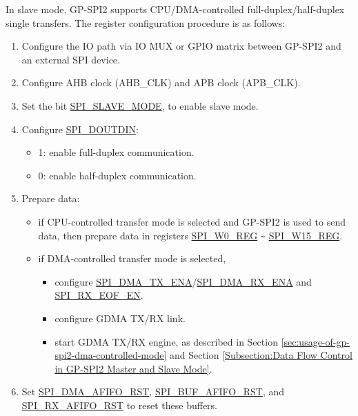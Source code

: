 \documentclass[main\_\_EN.tex]{subfiles}
\begin{document}
In slave mode, GP-SPI2 supports CPU/DMA-controlled full-duplex/half-duplex single transfers. The register configuration procedure is as follows:
\begin{enumerate}
    \item Configure the IO path via IO MUX or GPIO matrix between GP-SPI2 and an external SPI device.

    \item Configure AHB clock (AHB\_CLK) and APB clock (APB\_CLK).

    \item Set the bit \hyperref[fielddesc:SPISLAVEMODE]{SPI\_SLAVE\_MODE}, to enable slave mode.

    \item Configure \hyperref[fielddesc:SPIDOUTDIN]{SPI\_DOUTDIN}:
    \begin{itemize}
        \item 1: enable full-duplex communication.
        \item 0: enable half-duplex communication.
    \end{itemize}

    \item Prepare data:
    \begin{itemize}
        \item if CPU-controlled transfer mode is selected and GP-SPI2 is used to send data, then prepare data in registers \hyperref[regdesc:SPIW0REG]{SPI\_W0\_REG} \verb+~+ \hyperref[regdesc:SPIW15REG]{SPI\_W15\_REG}.
        \item if DMA-controlled transfer mode is selected,
        \begin{itemize}
            \item configure \hyperref[fielddesc:SPIDMATXENA]{SPI\_DMA\_TX\_ENA}/\hyperref[fielddesc:SPIDMARXENA]{SPI\_DMA\_RX\_ENA} and \hyperref[fielddesc:SPIRXEOFEN]{SPI\_RX\_EOF\_EN}.
            \item configure GDMA TX/RX link.
            \item start GDMA TX/RX engine, as described in Section \ref{sec:usage-of-gp-spi2-dma-controlled-mode} and Section \ref{Subsection:Data Flow Control in GP-SPI2 Master and Slave Mode}.
        \end{itemize}
    \end{itemize}

    \item Set \hyperref[fielddesc:SPIDMAAFIFORST]{SPI\_DMA\_AFIFO\_RST}, \hyperref[fielddesc:SPIBUFAFIFORST]{SPI\_BUF\_AFIFO\_RST}, and \hyperref[fielddesc:SPIRXAFIFORST]{SPI\_RX\_AFIFO\_RST} to reset these buffers.


\end{enumerate}
\end{document}
